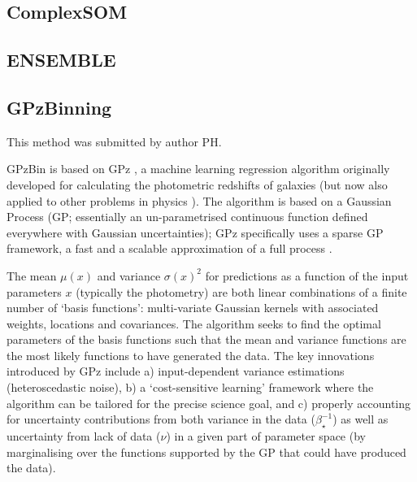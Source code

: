 \documentclass[twocolumn,twocolappendix]{aastex63}
\begin{document}
\subsection{ {\sc ComplexSOM} }


\subsection{ {\sc ENSEMBLE} }


\subsection{ {\sc GPzBinning} }
This method was submitted by author PH.

GPzBin is based on GPz \citep{Almosallam2016a,Almosallam2016b}, a machine learning
regression algorithm originally developed for calculating the photometric
redshifts of galaxies \citep{Gomes2017,Duncan2018,Hatfield2020} (but now also
applied to other problems in physics \citep{Peng2019,Hatfield2020}). The
algorithm is based on a Gaussian Process (GP; essentially an un-parametrised continuous
function defined everywhere with Gaussian uncertainties); GPz specifically uses 
a sparse GP framework, a fast and a scalable approximation
of a full process \citep{Rasmussen2006}.

The mean $\mu(x)$ and variance $\sigma(x)^2$ for predictions as a function of
the input parameters $x$ (typically the photometry) are both linear combinations
of a finite number of `basis functions': multi-variate Gaussian kernels with
associated weights, locations and covariances. The algorithm seeks to find the
optimal parameters of the basis functions such that the mean and variance
functions are the most likely functions to have generated the data. The key
innovations introduced by GPz include a) input-dependent variance estimations
(heteroscedastic noise), b) a `cost-sensitive learning' framework where the
algorithm can be tailored for the precise science goal, and c) properly
accounting for uncertainty contributions from both variance in the data
($\beta^{-1}_{\star}$) as well as uncertainty from lack of data ($\nu$) in a
given part of parameter space (by marginalising over the functions supported by
the GP that could have produced the data).

\end{document}

